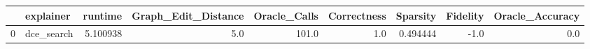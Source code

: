 \begin{tabular}{llrrrrrrr}
\toprule
{} &   explainer &   runtime &  Graph\_Edit\_Distance &  Oracle\_Calls &  Correctness &  Sparsity &  Fidelity &  Oracle\_Accuracy \\
\midrule
0 &  dce\_search &  5.100938 &                  5.0 &         101.0 &          1.0 &  0.494444 &      -1.0 &              0.0 \\
\bottomrule
\end{tabular}
